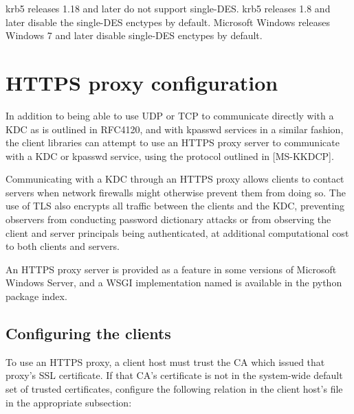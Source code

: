 \documentclass[letterpaper,10pt,english]{sphinxmanual}
\begin{document}
krb5 releases 1.18 and later do not support single-DES.  krb5 releases
1.8 and later disable the single-DES enctypes by default.  Microsoft
Windows releases Windows 7 and later disable single-DES enctypes by
default.


\chapter{HTTPS proxy configuration}
\label{\detokenize{admin/https:https-proxy-configuration}}\label{\detokenize{admin/https::doc}}\label{\detokenize{admin/https:https}}
In addition to being able to use UDP or TCP to communicate directly
with a KDC as is outlined in RFC4120, and with kpasswd services in a
similar fashion, the client libraries can attempt to use an HTTPS
proxy server to communicate with a KDC or kpasswd service, using the
protocol outlined in {[}MS-KKDCP{]}.

Communicating with a KDC through an HTTPS proxy allows clients to
contact servers when network firewalls might otherwise prevent them
from doing so.  The use of TLS also encrypts all traffic between the
clients and the KDC, preventing observers from conducting password
dictionary attacks or from observing the client and server principals
being authenticated, at additional computational cost to both clients
and servers.

An HTTPS proxy server is provided as a feature in some versions of
Microsoft Windows Server, and a WSGI implementation named 
is available in the python package index.


\section{Configuring the clients}
\label{\detokenize{admin/https:configuring-the-clients}}
To use an HTTPS proxy, a client host must trust the CA which issued
that proxy’s SSL certificate.  If that CA’s certificate is not in the
system-wide default set of trusted certificates, configure the
following relation in the client host’s {\hyperref[\detokenize{admin/conf_files/krb5_conf:krb5-conf-5}]{}} file in
the appropriate {\hyperref[\detokenize{admin/conf_files/krb5_conf:realms}]{}} subsection:

%
\begin{sphinxVerbatim}[commandchars=\\\{\}]
  
\end{sphinxVerbatim}
\end{document}
